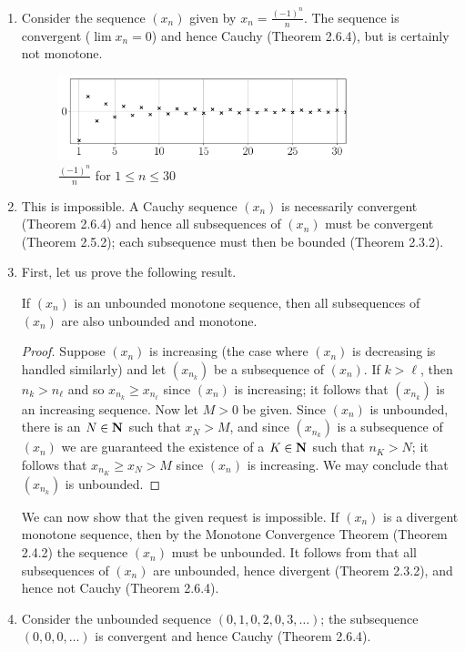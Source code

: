 \documentclass{lew98_solutions}
\begin{document}
\begin{solution}
    \begin{enumerate}
        \item Consider the sequence \( (x_n) \) given by \( x_n = \tfrac{(-1)^n}{n} \). The sequence is convergent (\( \lim x_n = 0 \)) and hence Cauchy (Theorem 2.6.4), but is certainly not monotone.
        \begin{figure}[H]
            \centering
            \includegraphics[width=0.8\textwidth]{UA_Figures/UA_ex2_6_2_fig.pdf}
            \caption{\(  \tfrac{(-1)^n}{n} \) for \( 1 \leq n \leq 30 \)}
            \label{fig:ex2.6.2}
        \end{figure}

        \item This is impossible. A Cauchy sequence \( (x_n) \) is necessarily convergent (Theorem 2.6.4) and hence all subsequences of \( (x_n) \) must be convergent (Theorem 2.5.2); each subsequence must then be bounded (Theorem 2.3.2).

        \item First, let us prove the following result.
        \begin{lemma}
        \label{lem:ex2.6.2}
            If \( (x_n) \) is an unbounded monotone sequence, then all subsequences of \( (x_n) \) are also unbounded and monotone.
        \end{lemma}
        \begin{proof}
            Suppose \( (x_n) \) is increasing (the case where \( (x_n) \) is decreasing is handled similarly) and let \( (x_{n_k}) \) be a subsequence of \( (x_n) \). If \( k > \ell \), then \( n_k > n_{\ell} \) and so \( x_{n_k} \geq x_{n_{\ell}} \) since \( (x_n) \) is increasing; it follows that \( (x_{n_k}) \) is an increasing sequence. Now let \( M > 0 \) be given. Since \( (x_n) \) is unbounded, there is an \( N \in \mathbf{N} \) such that \( x_N > M \), and since \( (x_{n_k}) \) is a subsequence of \( (x_n) \) we are guaranteed the existence of a \( K \in \mathbf{N} \) such that \( n_K > N \); it follows that \( x_{n_K} \geq x_N > M \) since \( (x_n) \) is increasing. We may conclude that \( (x_{n_k}) \) is unbounded.
        \end{proof}
        We can now show that the given request is impossible. If \( (x_n) \) is a divergent monotone sequence, then by the Monotone Convergence Theorem (Theorem 2.4.2) the sequence \( (x_n) \) must be unbounded. It follows from  that all subsequences of \( (x_n) \) are unbounded, hence divergent (Theorem 2.3.2), and hence not Cauchy (Theorem 2.6.4).

        \item Consider the unbounded sequence \( (0, 1, 0, 2, 0, 3, \ldots) \); the subsequence \( (0, 0, 0, \ldots) \) is convergent and hence Cauchy (Theorem 2.6.4).
    \end{enumerate}
\end{solution}
\end{document}
